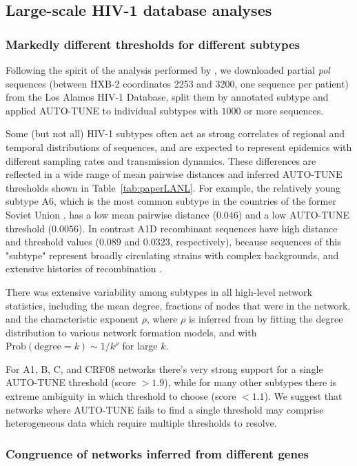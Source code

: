 \documentclass[utf8]{FrontiersinHarvard} %
\begin{document}
\subsection{Large-scale HIV-1 database analyses}

\subsubsection{Markedly different thresholds for different subtypes}
Following the spirit of the analysis performed by \citet{Wertheim:2014aa}, we
downloaded partial {\it pol} sequences (between HXB-2 coordinates 2253 and
3200, one sequence per patient) from the Los Alamos HIV-1 Database, split them
by annotated subtype and applied AUTO-TUNE to individual subtypes with $1000$
or more sequences.

Some (but not all) HIV-1 subtypes often act as strong correlates of regional
and temporal distributions of sequences, and are expected to represent
epidemics with different sampling rates and transmission dynamics. These
differences are reflected in a wide range of mean pairwise distances and
inferred AUTO-TUNE thresholds shown in Table~\ref{tab:paperLANL}. For example,
the relatively young subtype A6, which is the most common subtype in the
countries of the former Soviet Union \cite{Abidi:2021aa}, has a low mean
pairwise distance ($0.046$) and a low AUTO-TUNE threshold ($0.0056$). In
contrast A1D recombinant sequences have high distance and threshold values
($0.089$ and $0.0323$, respectively), because sequences of this "subtype"
represent broadly circulating strains with complex backgrounds, and extensive
histories of recombination \cite{Foster:2014aa,Yebra:2015aa}.

There was extensive variability among subtypes in all high-level network
statistics, including the mean degree, fractions of nodes that were in the
network, and the characteristic exponent $\rho$, where $\rho$ is inferred from
by fitting the degree distribution to various network formation models, and
with $\text{Prob}(\text{degree} = k) \sim 1/k^\rho$ for large $k$.

For A1, B, C, and CRF08 networks there's very strong support for a single
AUTO-TUNE threshold (score $>1.9$), while for many other subtypes there is
extreme ambiguity in which threshold to choose (score $<1.1$). We suggest that
networks where AUTO-TUNE fails to find a single threshold may comprise
heterogeneous data which require multiple thresholds to resolve.

\subsubsection{Congruence of networks inferred from different genes}
\end{document}
